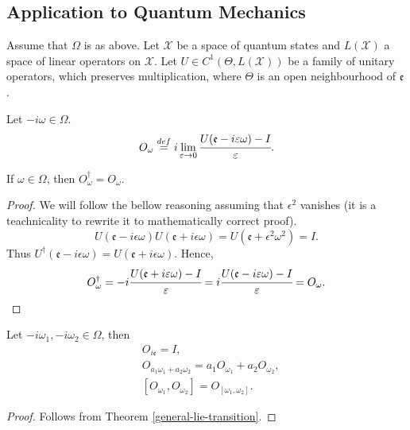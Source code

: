\documentclass[main.tex]{subfiles}
\begin{document}
\subsection{Application to Quantum Mechanics}

Assume that $\Omega$ is as above. Let $\mathcal{X}$ be a space of quantum states and $L(\mathcal{X})$ a space of linear operators on $\mathcal{X}$. Let $U\in C^1(\Theta, L(\mathcal{X}))$ be a family of unitary operators, which preserves multiplication, where $\Theta$ is an open neighbourhood of $\mathfrak{e}$.

\begin{definition} Let $-i\omega\in \Omega$.
\label{general-observable-definition}
\begin{equation}
O_\omega \stackrel{def}{=} i\lim_{\epsilon \to 0} \cfrac{U(\mathfrak{e} - i\epsilon \omega) - I}{\epsilon}.
\end{equation}
\end{definition}

\begin{proposition}
If $\omega\in \Omega$, then $O_\omega^\dagger = O_\omega$.
\end{proposition}
\begin{proof}
We will follow the bellow reasoning assuming that $\epsilon^2$ vanishes (it is a teachnicality to rewrite it to mathematically correct proof).
\begin{equation}
U(\mathfrak{e} - i\epsilon \omega)U(\mathfrak{e} + i\epsilon \omega) = U(\mathfrak{e} + \epsilon^2 \omega^2) = I.
\end{equation}
Thus $U^\dagger(\mathfrak{e} - i\epsilon \omega) = U(\mathfrak{e} + i\epsilon \omega)$. Hence,
\begin{align*}
O^\dagger_\omega = -i \cfrac{U(\mathfrak{e} + i\epsilon \omega) - I}{\epsilon} = i \cfrac{U(\mathfrak{e} - i\epsilon \omega) - I}{\epsilon} = O_\omega. 
\end{align*}
\end{proof}
\begin{proposition}
\label{general-lie-transition-quantum}
Let $-i\omega_1, -i\omega_2 \in \Omega$, then
\begin{align}
& O_{i\mathfrak{e}}  = I,\\
& O_{a_1\omega_1 + a_2\omega_2} = a_1 O_{\omega_1} + a_2 O_{\omega_2},\\
& [O_{\omega_1}, O_{\omega_2}] = O_{[\omega_1, \omega_2]}.
\end{align}
\end{proposition}
\begin{proof}
Follows from Theorem \ref{general-lie-transition}.
\end{proof}
\end{document}
